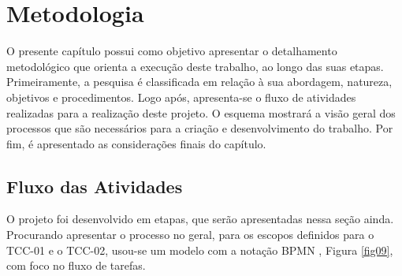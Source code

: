 \chapter*[Metodologia]{Metodologia}

O presente capítulo possui como objetivo apresentar o detalhamento metodológico que orienta a execução deste trabalho, ao longo das suas etapas. Primeiramente, a pesquisa é classificada em relação à sua abordagem, natureza, objetivos e procedimentos. Logo após, apresenta-se  o fluxo de atividades realizadas para a realização deste projeto. O esquema mostrará a visão geral dos processos que são necessários para a criação e desenvolvimento do trabalho. Por fim, é apresentado as considerações finais do capítulo.

\section{Fluxo das Atividades}

O projeto foi desenvolvido em etapas, que serão apresentadas nessa seção ainda. Procurando apresentar o processo no geral, para os escopos definidos para o TCC-01 e o TCC-02, usou-se um modelo com a notação BPMN \cite{bpmn}, Figura \ref{fig09}, com foco no fluxo de tarefas.

